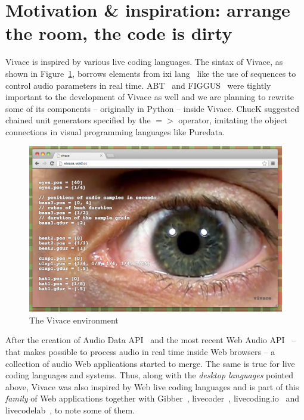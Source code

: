 \documentclass[letterpaper, 12pt]{article}
\begin{document}
\parskip 18pt

\section{Motivation \& inspiration: arrange the room, the code is dirty}
Vivace is inspired by various live coding languages. The sintax of
Vivace, as shown in Figure~\ref{fig:vivace}, borrows elements from ixi
lang~\citep{magnusson2011ixi} like the use of sequences to control
audio parameters in real time. ABT~\citep{fabbri} and
FIGGUS~\citep{fabbri2} were tightly important to the development of
Vivace as well and we are planning to rewrite some of its components
-- originally in Python -- inside Vivace. ChucK 
suggested chained unit generators specified by the $=>$ operator,
imitating the object connections in visual programming languages like
Puredata.

\begin{figure}[htpb]
  \begin{center}
    \includegraphics[scale=.3]{img/fig_vivace.png}
    \caption{The Vivace environment}
    \label{fig:vivace}
  \end{center}
\end{figure}

After the creation of Audio Data
API~\citep*{audiodata} and the most recent Web Audio API~\citep*{webaudio}
-- that makes possible to process audio in real time inside Web
browsers -- a collection of audio Web applications started to
merge. The same is true for live coding languages and systems.
Thus, along with the \textit{desktop languages} pointed above,
Vivace was also inspired by
Web live coding languages and
is part of this \textit{family} of Web applications together with
Gibber~\citep*{gibber}, livecoder~\citep*{livecoder},
livecoding.io~\citep*{livecodingio} and livecodelab~\citep*{livecodelab},
to note some of them. 
\end{document}
